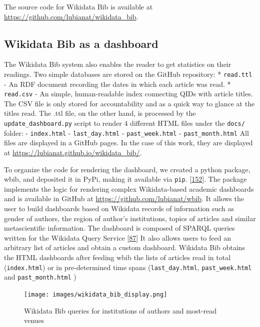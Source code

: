 The source code for Wikidata Bib is available at \url{https://github.com/lubianat/wikidata_bib}.

\hypertarget{wikidata-bib-as-a-dashboard}{%
\subsection{Wikidata Bib as a dashboard}\label{wikidata-bib-as-a-dashboard}}

The Wikidata Bib system also enables the reader to get statistics on their readings.
Two simple databases are stored on the GitHub repository:
* \texttt{read.ttl} - An RDF document recording the dates in which each article was read.
* \texttt{read.csv} - An simple, human-readable index connecting QIDs with article titles.
The CSV file is only stored for accountability and as a quick way to glance at the titles read.
The .ttl file, on the other hand, is processed by the \texttt{update\_dashboard.py} script to render 4 different HTML files under the \texttt{docs/} folder:
- \texttt{index.html}
- \texttt{last\_day.html}
- \texttt{past\_week.html}
- \texttt{past\_month.html}
All files are displayed in a GitHub pages.
In the case of this work, they are displayed at \url{https://lubianat.github.io/wikidata_bib/}.

To organize the code for rendering the dashboard, we created a python package, wbib, and deposited it in PyPi, making it available via \texttt{pip}. {[}\protect\hyperlink{ref-6chnW6cc}{152}{]}.
The package implements the logic for rendering complex Wikidata-based academic dashboards and is available in GitHub at \url{https://github.com/lubianat/wbib}.
It allows the user to build dashboards based on Wikidata records of information such as gender of authors, the region of author's institutions, topics of articles and similar metascientific information.
The dashboard is composed of SPARQL queries written for the Wikidata Query Service {[}\protect\hyperlink{ref-2wDsXBwd}{87}{]}
It also allows users to feed an arbitrary list of articles and obtain a custom dashboard.
Wikidata Bib obtains the HTML dashboards after feeding wbib the lists of articles read in total (\texttt{index.html}) or in pre-determined time spans (\texttt{last\_day.html}, \texttt{past\_week.html} and \texttt{past\_month.html} )

\begin{figure}
\hypertarget{fig:dashboard}{%
\centering
\texttt{[image: images/wikidata\_bib\_display.png]}
\caption{Wikidata Bib queries for institutions of authors and most-read venues}\label{fig:dashboard}
}
\end{figure}

